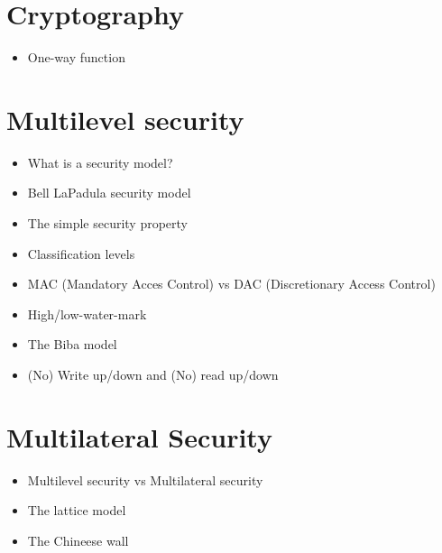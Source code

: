 \section{Cryptography}
	\begin{itemize}
		\item One-way function
	\end{itemize}

\section{Multilevel security}
	\begin{itemize}
		\item What is a security model?
		\item Bell LaPadula security model
		\item The simple security property
		\item Classification levels
		\item MAC (Mandatory Acces Control) vs DAC (Discretionary Access Control)
		\item High/low-water-mark
		\item The Biba model
		\item (No) Write up/down and (No) read up/down
	\end{itemize}

\section{Multilateral Security}
	\begin{itemize}
		\item Multilevel security vs Multilateral security
		\item The lattice model
		\item The Chineese wall
	\end{itemize}
